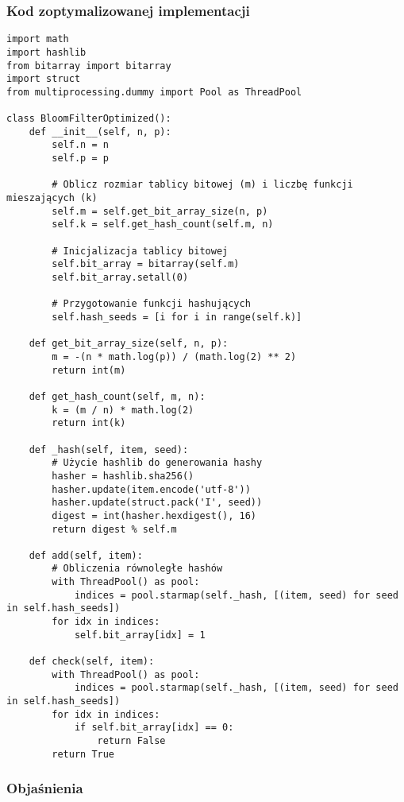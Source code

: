 \documentclass{article}
\begin{document}
\subsubsection{Kod zoptymalizowanej implementacji}

\begin{lstlisting}[style=pystyle, caption=Zoptymalizowana implementacja filtru Blooma]
import math
import hashlib
from bitarray import bitarray
import struct
from multiprocessing.dummy import Pool as ThreadPool

class BloomFilterOptimized():
    def __init__(self, n, p):
        self.n = n
        self.p = p

        # Oblicz rozmiar tablicy bitowej (m) i liczbę funkcji mieszających (k)
        self.m = self.get_bit_array_size(n, p)
        self.k = self.get_hash_count(self.m, n)

        # Inicjalizacja tablicy bitowej
        self.bit_array = bitarray(self.m)
        self.bit_array.setall(0)

        # Przygotowanie funkcji hashujących
        self.hash_seeds = [i for i in range(self.k)]

    def get_bit_array_size(self, n, p):
        m = -(n * math.log(p)) / (math.log(2) ** 2)
        return int(m)

    def get_hash_count(self, m, n):
        k = (m / n) * math.log(2)
        return int(k)

    def _hash(self, item, seed):
        # Użycie hashlib do generowania hashy
        hasher = hashlib.sha256()
        hasher.update(item.encode('utf-8'))
        hasher.update(struct.pack('I', seed))
        digest = int(hasher.hexdigest(), 16)
        return digest % self.m

    def add(self, item):
        # Obliczenia równoległe hashów
        with ThreadPool() as pool:
            indices = pool.starmap(self._hash, [(item, seed) for seed in self.hash_seeds])
        for idx in indices:
            self.bit_array[idx] = 1

    def check(self, item):
        with ThreadPool() as pool:
            indices = pool.starmap(self._hash, [(item, seed) for seed in self.hash_seeds])
        for idx in indices:
            if self.bit_array[idx] == 0:
                return False
        return True
\end{lstlisting}

\subsubsection{Objaśnienia}
\end{document}
